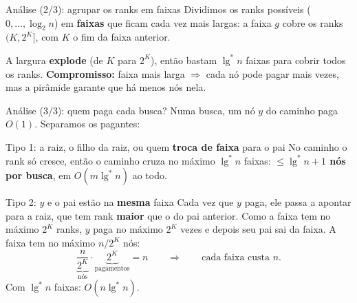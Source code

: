 \documentclass[aspectratio=169,10pt]{beamer}
\renewcommand{\lg}{\operatorname{lg}}
\newcommand{\lgs}{\lg^{*}}
\begin{document}
\begin{frame}[t]{Análise (2/3): agrupar os ranks em faixas}
  \small
  Dividimos os ranks possíveis ($0,\dots,\log_2n$) em \textbf{faixas}
  que ficam cada vez mais largas: a faixa $g$ cobre os ranks
  $(K,2^K]$, com $K$ o fim da faixa anterior.

  \medskip
  \centering

  \medskip
  \raggedright
  A largura \textbf{explode} (de $K$ para $2^K$), então bastam
  $\lgs n$ faixas para cobrir todos os ranks.  \textbf{Compromisso:}
  faixa mais larga $\Rightarrow$ cada nó pode pagar mais vezes, mas a
  pirâmide garante que há menos nós nela.
\end{frame}

\begin{frame}[t]{Análise (3/3): quem paga cada busca?}
  \small
  Numa busca, um nó $y$ do caminho paga $O(1)$.  Separamos os pagantes:

  \medskip
  \begin{block}{Tipo 1: a raiz, o filho da raiz, ou quem \textbf{troca de faixa} para o pai}
    No caminho o rank só cresce, então o caminho cruza no máximo
    $\lgs n$ faixas: \textbf{$\leq\lgs n+1$ nós por busca}, em
    $O(m\lgs n)$ ao todo.
  \end{block}

  \begin{block}{Tipo 2: $y$ e o pai estão na \textbf{mesma} faixa}
    Cada vez que $y$ paga, ele passa a apontar para a raiz, que tem rank
    \textbf{maior} que o do pai anterior.  Como a faixa tem no máximo
    $2^K$ ranks, $y$ paga no máximo $2^K$ vezes e depois seu pai sai da
    faixa.  A faixa tem no máximo $n/2^K$ nós:
    \[
      \underbrace{\frac{n}{2^K}}_{\text{nós}}\cdot
      \underbrace{2^K}_{\text{pagamentos}}=n
      \qquad\Rightarrow\qquad \text{cada faixa custa }n.
    \]
    Com $\lgs n$ faixas: $O(n\lgs n)$.
  \end{block}
\end{frame}
\end{document}
